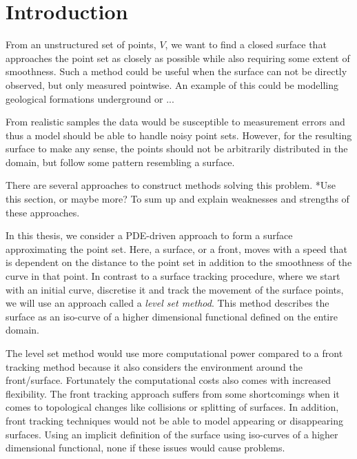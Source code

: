 \chapter{Introduction}

From an unstructured set of points, $V$, we want to find a closed surface that approaches the point set as closely as possible while also requiring some extent of smoothness. Such a method could be useful when the surface can not be directly observed, but only measured pointwise. An example of this could be modelling geological formations underground or ...

From realistic samples the data would be susceptible to measurement errors and thus a model should be able to handle noisy point sets. However, for the resulting surface to make any sense, the points should not be arbitrarily distributed in the domain, but follow some pattern resembling a surface.

There are several approaches to construct methods solving this problem. *Use this section, or maybe more? To sum up and explain weaknesses and strengths of these approaches.

In this thesis, we consider a PDE-driven approach to form a surface approximating the point set. Here, a surface, or a front, moves with a speed that is dependent on the distance to the point set in addition to the smoothness of the curve in that point. In contrast to a surface tracking procedure, where we start with an initial curve, discretise it and track the movement of the surface points, we will use an approach called a \textit{level set method}. This method describes the surface as an iso-curve of a higher dimensional functional defined on the entire domain. 

The level set method would use more computational power compared to a front tracking method because it also considers the environment around the front/surface. Fortunately the computational costs also comes with increased flexibility. The front tracking approach suffers from some shortcomings when it comes to topological changes like collisions or splitting of surfaces. In addition, front tracking techniques would not be able to model  appearing or disappearing surfaces. Using an implicit definition of the surface using iso-curves of a higher dimensional functional, none if these issues would cause problems. 




 
